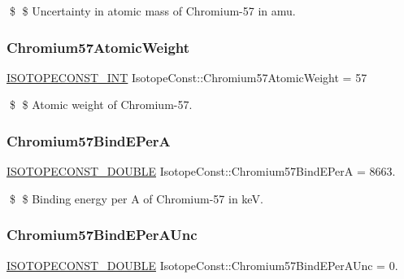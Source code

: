 \$ \$ Uncertainty in atomic mass of Chromium-\/57 in amu. \mbox{\label{group___isotope_const-_chromium-_cr57_ga5bcec77ae65b869db7bf51a519bcdec7}} 
\subsubsection{\texorpdfstring{Chromium57\+Atomic\+Weight}{Chromium57AtomicWeight}}
{\footnotesize\ttfamily \mbox{\hyperlink{group___isotope_const-_macros_ga5f18360b3e99483a35c32d789e62621c}{I\+S\+O\+T\+O\+P\+E\+C\+O\+N\+S\+T\+\_\+\+I\+NT}} Isotope\+Const\+::\+Chromium57\+Atomic\+Weight = 57}

\$ \$ Atomic weight of Chromium-\/57. \mbox{\label{group___isotope_const-_chromium-_cr57_ga13c97a0852992afda3469489e54ba33a}} 
\subsubsection{\texorpdfstring{Chromium57\+Bind\+E\+PerA}{Chromium57BindEPerA}}
{\footnotesize\ttfamily \mbox{\hyperlink{group___isotope_const-_macros_ga8f45a7272ce02c0b4c65c44636ed719a}{I\+S\+O\+T\+O\+P\+E\+C\+O\+N\+S\+T\+\_\+\+D\+O\+U\+B\+LE}} Isotope\+Const\+::\+Chromium57\+Bind\+E\+PerA = 8663.}

\$ \$ Binding energy per A of Chromium-\/57 in keV. \mbox{\label{group___isotope_const-_chromium-_cr57_ga898a9631dc380c7188d3f879dea5fc9f}} 
\subsubsection{\texorpdfstring{Chromium57\+Bind\+E\+Per\+A\+Unc}{Chromium57BindEPerAUnc}}
{\footnotesize\ttfamily \mbox{\hyperlink{group___isotope_const-_macros_ga8f45a7272ce02c0b4c65c44636ed719a}{I\+S\+O\+T\+O\+P\+E\+C\+O\+N\+S\+T\+\_\+\+D\+O\+U\+B\+LE}} Isotope\+Const\+::\+Chromium57\+Bind\+E\+Per\+A\+Unc = 0.}

